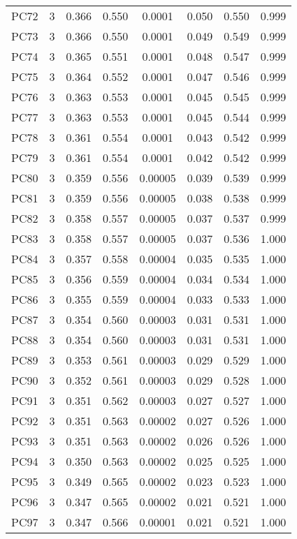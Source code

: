 \begin{table}[!htbp]
\begin{tabular}{@{\extracolsep{5pt}}lccccccc}
PC72 & 3 & 0.366 & 0.550 & 0.0001 & 0.050 & 0.550 & 0.999 \\ 
PC73 & 3 & 0.366 & 0.550 & 0.0001 & 0.049 & 0.549 & 0.999 \\ 
PC74 & 3 & 0.365 & 0.551 & 0.0001 & 0.048 & 0.547 & 0.999 \\ 
PC75 & 3 & 0.364 & 0.552 & 0.0001 & 0.047 & 0.546 & 0.999 \\ 
PC76 & 3 & 0.363 & 0.553 & 0.0001 & 0.045 & 0.545 & 0.999 \\ 
PC77 & 3 & 0.363 & 0.553 & 0.0001 & 0.045 & 0.544 & 0.999 \\ 
PC78 & 3 & 0.361 & 0.554 & 0.0001 & 0.043 & 0.542 & 0.999 \\ 
PC79 & 3 & 0.361 & 0.554 & 0.0001 & 0.042 & 0.542 & 0.999 \\ 
PC80 & 3 & 0.359 & 0.556 & 0.00005 & 0.039 & 0.539 & 0.999 \\ 
PC81 & 3 & 0.359 & 0.556 & 0.00005 & 0.038 & 0.538 & 0.999 \\ 
PC82 & 3 & 0.358 & 0.557 & 0.00005 & 0.037 & 0.537 & 0.999 \\ 
PC83 & 3 & 0.358 & 0.557 & 0.00005 & 0.037 & 0.536 & 1.000 \\ 
PC84 & 3 & 0.357 & 0.558 & 0.00004 & 0.035 & 0.535 & 1.000 \\ 
PC85 & 3 & 0.356 & 0.559 & 0.00004 & 0.034 & 0.534 & 1.000 \\ 
PC86 & 3 & 0.355 & 0.559 & 0.00004 & 0.033 & 0.533 & 1.000 \\ 
PC87 & 3 & 0.354 & 0.560 & 0.00003 & 0.031 & 0.531 & 1.000 \\ 
PC88 & 3 & 0.354 & 0.560 & 0.00003 & 0.031 & 0.531 & 1.000 \\ 
PC89 & 3 & 0.353 & 0.561 & 0.00003 & 0.029 & 0.529 & 1.000 \\ 
PC90 & 3 & 0.352 & 0.561 & 0.00003 & 0.029 & 0.528 & 1.000 \\ 
PC91 & 3 & 0.351 & 0.562 & 0.00003 & 0.027 & 0.527 & 1.000 \\ 
PC92 & 3 & 0.351 & 0.563 & 0.00002 & 0.027 & 0.526 & 1.000 \\ 
PC93 & 3 & 0.351 & 0.563 & 0.00002 & 0.026 & 0.526 & 1.000 \\ 
PC94 & 3 & 0.350 & 0.563 & 0.00002 & 0.025 & 0.525 & 1.000 \\ 
PC95 & 3 & 0.349 & 0.565 & 0.00002 & 0.023 & 0.523 & 1.000 \\ 
PC96 & 3 & 0.347 & 0.565 & 0.00002 & 0.021 & 0.521 & 1.000 \\ 
PC97 & 3 & 0.347 & 0.566 & 0.00001 & 0.021 & 0.521 & 1.000 \\ 

\end{tabular}
\end{table}
